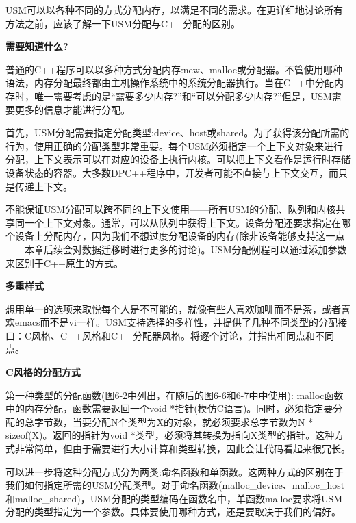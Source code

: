 USM可以以各种不同的方式分配内存，以满足不同的需求。在更详细地讨论所有方法之前，应该了解一下USM分配与C++分配的区别。\par

\hspace*{\fill} \par %
\textbf{需要知道什么?}

普通的C++程序可以以多种方式分配内存:new、malloc或分配器。不管使用哪种语法，内存分配最终都由主机操作系统中的系统分配器执行。当在C++中分配内存时，唯一需要考虑的是“需要多少内存?”和“可以分配多少内存?”但是，USM需要更多的信息才能进行分配。\par

首先，USM分配需要指定分配类型:device、host或shared。为了获得该分配所需的行为，使用正确的分配类型非常重要。每个USM必须指定一个上下文对象来进行分配，上下文表示可以在对应的设备上执行内核。可以把上下文看作是运行时存储设备状态的容器。大多数DPC++程序中，开发者可能不直接与上下文交互，而只是传递上下文。\par

不能保证USM分配可以跨不同的上下文使用——所有USM的分配、队列和内核共享同一个上下文对象。通常，可以从队列中获得上下文。设备分配还要求指定在哪个设备上分配内存，因为我们不想过度分配设备的内存(除非设备能够支持这一点——本章后续会对数据迁移时进行更多的讨论)。USM分配例程可以通过添加参数来区别于C++原生的方式。\par

\hspace*{\fill} \par %
\textbf{多重样式}

想用单一的选项来取悦每个人是不可能的，就像有些人喜欢咖啡而不是茶，或者喜欢emacs而不是vi一样。USM支持选择的多样性，并提供了几种不同类型的分配接口：C风格、C++风格和C++分配器风格。将逐个讨论，并指出相同点和不同点。\par

\hspace*{\fill} \par %
\textbf{C风格的分配方式}

第一种类型的分配函数(图6-2中列出，在随后的图6-6和6-7中中使用): malloc函数中的内存分配，函数需要返回一个void *指针(模仿C语言)。同时，必须指定要分配的总字节数，当要分配N个类型为X的对象，就必须要求总字节数为N * sizeof(X)。返回的指针为void *类型，必须将其转换为指向X类型的指针。这种方式非常简单，但由于需要进行大小计算和类型转换，因此会让代码看起来很冗长。\par

可以进一步将这种分配方式分为两类:命名函数和单函数。这两种方式的区别在于我们如何指定所需的USM分配类型。对于命名函数(malloc\_device、malloc\_host和malloc\_shared)，USM分配的类型编码在函数名中，单函数malloc要求将USM分配的类型指定为一个参数。具体要使用哪种方式，还是要取决于我们的偏好。\par

